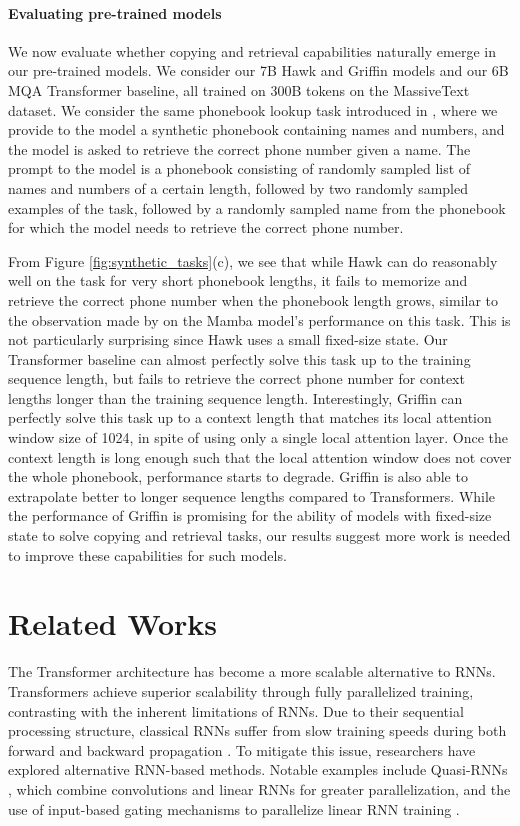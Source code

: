 \paragraph{Evaluating pre-trained models} 

We now evaluate whether copying and retrieval capabilities naturally emerge in our pre-trained models. We consider our 7B Hawk and Griffin models and our 6B MQA Transformer baseline, all trained on 300B tokens on the MassiveText dataset. We consider the same phonebook lookup task introduced in \citet{jelassi2024repeat}, where we provide to the model a synthetic phonebook containing names and numbers, and the model is asked to retrieve the correct phone number given a name. The prompt to the model is a phonebook consisting of randomly sampled list of names and numbers of a certain length, followed by two randomly sampled examples of the task, followed by a randomly sampled name from the phonebook for which the model needs to retrieve the correct phone number.

From Figure \ref{fig:synthetic_tasks}(c), we see that while Hawk can do reasonably well on the task for very short phonebook lengths, it fails to memorize and retrieve the correct phone number when the phonebook length grows, similar to the observation made by \citet{jelassi2024repeat} on the Mamba model's performance on this task. This is not particularly surprising since Hawk uses a small fixed-size state. Our Transformer baseline can almost perfectly solve this task up to the training sequence length, but fails to retrieve the correct phone number for context lengths longer than the training sequence length. Interestingly, Griffin can perfectly solve this task up to a context length that matches its local attention window size of 1024, in spite of using only a single local attention layer. Once the context length is long enough such that the local attention window does not cover the whole phonebook, performance starts to degrade. Griffin is also able to extrapolate better to longer sequence lengths compared to Transformers. While the performance of Griffin is promising for the ability of models with fixed-size state to solve copying and retrieval tasks, our results suggest more work is needed to improve these  capabilities for such models.

\section{Related Works}

The Transformer architecture has become a more scalable alternative to RNNs. Transformers achieve superior scalability through fully parallelized training, contrasting with the inherent limitations of RNNs. Due to their sequential processing structure, classical RNNs suffer from slow training speeds during both forward and backward propagation \citep{werbos1990backpropagation}. To mitigate this issue, researchers have explored alternative RNN-based methods. Notable examples include Quasi-RNNs \citep{bradbury2016quasi}, which combine convolutions and linear RNNs for greater parallelization, and the use of input-based gating mechanisms to parallelize linear RNN training \citep{martin2017parallelizing}.

